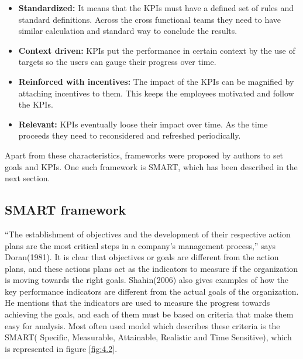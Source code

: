 \begin{itemize}
     \item \textbf{Standardized:}
     It means that the KPIs must have a defined set of rules and standard definitions. Across the cross functional teams they need to have similar calculation and standard way to conclude the results.\\ 
     \item \textbf{Context driven:}
     KPIs put the performance in certain context by the use of targets so the users can gauge their progress over time.\\ 
     \item \textbf{Reinforced with incentives:}
     The impact of the KPIs can be magnified by attaching incentives to them. This keeps the employees motivated and follow the KPIs.\\ 
     \item \textbf{Relevant:}
     KPIs eventually loose their impact over time. As the time proceeds they need to reconsidered and refreshed periodically.\\

 \end{itemize}

Apart from these characteristics, frameworks were proposed by authors to set goals and KPIs. One such framework is SMART, which has been described in the next section. \\

\subsection{SMART framework}
“The establishment of objectives and the development of their respective action plans are the most critical steps in a company's management process,” says Doran(1981). It is clear that objectives or goals are different from the action plans, and these actions plans act as the indicators to measure if the organization is moving towards the right goals. Shahin(2006) also gives examples of how the key performance indicators are different from the actual goals of the organization. He mentions that the indicators are used to measure the progress towards achieving the goals, and each of them must be based on criteria that make them easy for analysis. Most often used model which describes these criteria is the SMART( Specific, Measurable, Attainable, Realistic and  Time Sensitive), which is represented in figure \ref{fig:4.2}.

